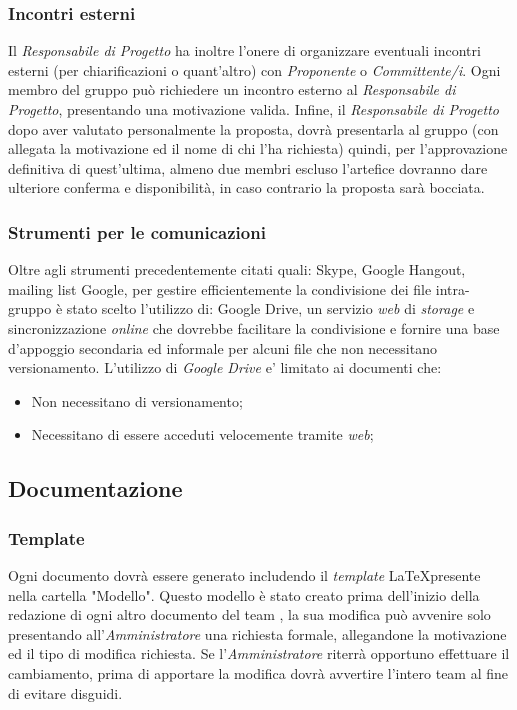 \subsubsection{Incontri esterni}
Il \textit{Responsabile di Progetto} ha inoltre l'onere di organizzare eventuali incontri esterni (per chiarificazioni o quant'altro) con \textit{Proponente} o \textit{Committente/i}. Ogni membro del gruppo può richiedere un incontro esterno al \textit{Responsabile di Progetto}, presentando una motivazione valida.
Infine, il \textit{Responsabile di Progetto} dopo aver valutato personalmente la proposta, dovrà presentarla al gruppo (con allegata la motivazione ed il nome di chi l'ha richiesta) quindi, per l'approvazione definitiva di quest'ultima, almeno due membri escluso l'artefice dovranno dare ulteriore conferma e disponibilità, in caso contrario la proposta sarà bocciata.
\subsubsection{Strumenti per le comunicazioni}
Oltre agli strumenti precedentemente citati quali: Skype, Google Hangout, mailing list Google, per gestire efficientemente la condivisione dei file intra-gruppo è stato scelto l'utilizzo di: Google Drive, un servizio \textit{web} di \textit{storage} e sincronizzazione \textit{online} che dovrebbe facilitare la condivisione e fornire una base d'appoggio secondaria ed informale per alcuni file che non necessitano versionamento.
L'utilizzo di \textit{Google Drive} e' limitato ai documenti che:
\begin{itemize}
\item Non necessitano di versionamento;
\item Necessitano di essere acceduti velocemente tramite \textit{web};
\end{itemize}
\subsection{Documentazione}
\subsubsection{Template}
Ogni documento dovrà essere generato includendo il \textit{template} \LaTeX presente nella cartella "Modello".
Questo modello è stato creato prima dell'inizio della redazione di ogni altro documento del team \gruppo{}, la sua modifica può avvenire solo presentando all'\textit{Amministratore} una richiesta formale, allegandone la motivazione ed il tipo di modifica richiesta. Se l'\textit{Amministratore} riterrà opportuno effettuare il cambiamento, prima di apportare la modifica dovrà avvertire l'intero team al fine di evitare disguidi.

